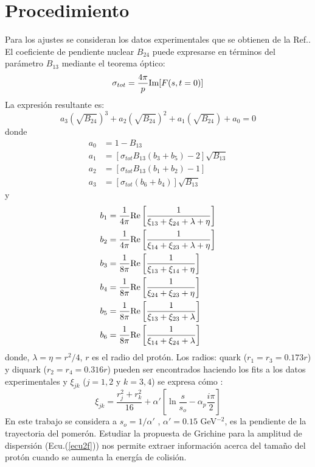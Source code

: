\section{Procedimiento}
Para los ajustes se consideran los datos experimentales que se obtienen de la Ref.\cite{martinov}. El coeficiente de pendiente nuclear $B_{24}$ puede expresarse en términos del parámetro $B_{13}$ mediante el teorema óptico\cite{varone,donachie}:
\begin{equation}
\sigma_{tot}=\frac{4\pi}{p}\textup{Im}[F(s,t=0)]
\end{equation}
La expresión resultante es:
\begin{equation}
a_3\left(\sqrt{B_{24}}\right)^3+a_2\left(\sqrt{B_{24}}\right)^2+a_{1}\left(\sqrt{B_{24}}\right)+a_0=0
\end{equation}
donde 
\begin{align}\label{misecu5}
\nonumber a_0&=1-B_{13}\\
\nonumber a_1&=[\sigma_{tot}B_{13}(b_3+b_5)-2]\sqrt{B_{13}}\\
\nonumber a_{2}&=[\sigma_{tot}B_{13}(b_1+b_2)-1]\\
a_{3}&=[\sigma_{tot}(b_6+b_4)]\sqrt{B_{13}}
\end{align}
y 
\begin{align}
\nonumber b_{1}&=\frac{1}{4\pi}\textup{Re}\left[ \frac{1}{\xi_{13}+\xi_{24}+\lambda+\eta}\right]\\
\nonumber b_{2}&=\frac{1}{4\pi}\textup{Re}\left[\frac{1}{\xi_{14}+\xi_{23}+\lambda+\eta}\right]\\
\nonumber b_{3}&=\frac{1}{8\pi}\textup{Re}\left[\frac{1}{\xi_{13}+\xi_{14}+\eta}\right]\\
\nonumber b_{4}&=\frac{1}{8\pi}\textup{Re}\left[\frac{1}{\xi_{24}+\xi_{23}+\eta}\right]
\\
\nonumber b_{5}&=\frac{1}{8\pi}\textup{Re}\left[\frac{1}{\xi_{13}+\xi_{23}+\lambda}\right]\\
b_{6}&=\frac{1}{8\pi}\textup{Re}\left[\frac{1}{\xi_{14}+\xi_{24}+\lambda}\right]
\end{align}
donde, $\lambda=\eta=r^2/4$, $r$ es el radio del prot\'on. Los radios:  quark ($r_{1}=r_{3}=0.173r$) y diquark ($r_{2}=r_4=0.316r$) pueden ser encontrados haciendo los fits a los datos experimentales y $\xi_{jk}$ ($j=1,2$ y $k=3,4$) se expresa c\'omo \cite{grichine,rusia}:
\begin{equation}
\xi_{jk}= \frac{r^2_j+r^2_k}{16}+\alpha'\left[\ln\frac{s}{s_{o}}-\alpha_p\frac{i\pi}{2} \right]
\end{equation}
En este trabajo se considera a  $s_{o}=1/\alpha'$ \cite{donachie}, $\alpha'=0.15$ GeV$^{-2}$, es la pendiente de la trayectoria del pomer\'on. 
Estudiar la propuesta de Grichine para la amplitud de dispersión (Ecu.(\ref{ecu2f})) nos permite extraer información acerca del tama\~no del prot\'on cuando se aumenta la energía de colisión.
